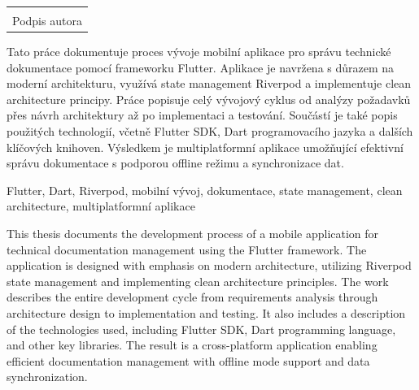 \documentclass[12pt, a4paper,
twoside,        %
openright
]{report}
\newcommand\datumOdevzdani{22. 3. 2024} %
\begin{document}
\vspace*{0.7\textheight}

\vfill
\noindent{V Opavě \datumOdevzdani\\}
\noindent
\begin{minipage}{\linewidth}
    \hspace{9.5cm}
    \begin{tabular}{@{}p{6cm}@{}}
        \dotfill \\
        Podpis autora
    \end{tabular}
\end{minipage}

\cleardoublepage

\noindent Tato práce dokumentuje proces vývoje mobilní aplikace pro správu technické dokumentace pomocí frameworku Flutter. Aplikace je navržena s důrazem na moderní architekturu, využívá state management Riverpod a implementuje clean architecture principy. Práce popisuje celý vývojový cyklus od analýzy požadavků přes návrh architektury až po implementaci a testování. Součástí je také popis použitých technologií, včetně Flutter SDK, Dart programovacího jazyka a dalších klíčových knihoven. Výsledkem je multiplatformní aplikace umožňující efektivní správu dokumentace s podporou offline režimu a synchronizace dat.

\vspace{18pt}

\noindent Flutter, Dart, Riverpod, mobilní vývoj, dokumentace, state management, clean architecture, multiplatformní aplikace

\vspace{18pt}

\noindent This thesis documents the development process of a mobile application for technical documentation management using the Flutter framework. The application is designed with emphasis on modern architecture, utilizing Riverpod state management and implementing clean architecture principles. The work describes the entire development cycle from requirements analysis through architecture design to implementation and testing. It also includes a description of the technologies used, including Flutter SDK, Dart programming language, and other key libraries. The result is a cross-platform application enabling efficient documentation management with offline mode support and data synchronization.
\end{document}

